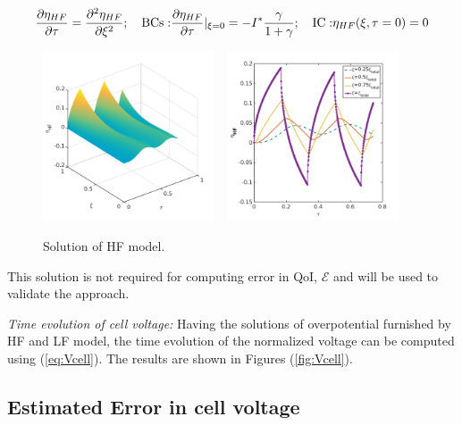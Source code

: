 \documentclass[]{article}
\begin{document}
\begin{equation*}
\frac{\partial\eta_{HF}}{\partial\tau} = \frac{\partial^2\eta_{HF}}{\partial\xi^2}; \quad
{\rm BCs:}  \frac{\partial\eta_{HF}}{\partial\tau}|_{\xi=0} = -I^* \frac{\gamma}{1+\gamma}; \quad 
{\rm IC:}  \eta_{HF}(\xi,\tau=0)=0
\end{equation*}
%
\begin{figure}[h]
    \centering
    \includegraphics[trim = 0in 0in 0in 0in, clip, width=0.45\textwidth]{figures/cyclic_new/etaHF3d.png}
    ~
    \includegraphics[trim = 0in 0in 0in 0in, clip, width=0.45\textwidth]{figures/cyclic_new/etaHF_t.png}  
    \vspace{-0.2in}    
    \caption{Solution of HF model.}
    \label{fig:etaHF}
\end{figure}
This solution is not required for computing error in QoI, $\mathcal{E}$ and will be used to validate the approach.

%
\noindent\textit{Time evolution of cell voltage:}
Having the solutions of overpotential furnished by HF and LF model, the time evolution of the normalized voltage can be computed using (\ref{eq:Vcell}). The results are shown in Figures (\ref{fig:Vcell}).


\subsection{Estimated Error in cell voltage}
\end{document}
